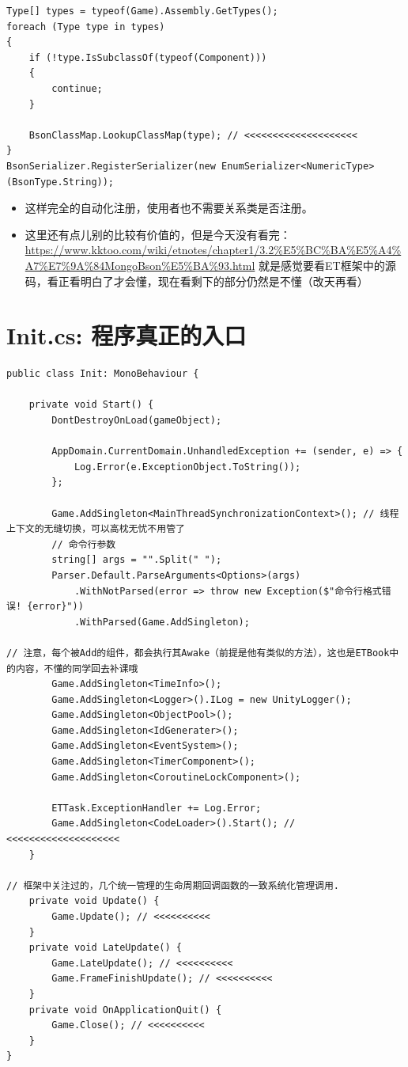 \documentclass[9pt, b5paper]{article}
\begin{document}
\begin{verbatim}
Type[] types = typeof(Game).Assembly.GetTypes();
foreach (Type type in types)
{
    if (!type.IsSubclassOf(typeof(Component)))
    {
        continue;
    }

    BsonClassMap.LookupClassMap(type); // <<<<<<<<<<<<<<<<<<<< 
}
BsonSerializer.RegisterSerializer(new EnumSerializer<NumericType>(BsonType.String));
\end{verbatim}
\begin{itemize}
\item 这样完全的自动化注册，使用者也不需要关系类是否注册。
\item 这里还有点儿别的比较有价值的，但是今天没有看完：\url{https://www.kktoo.com/wiki/etnotes/chapter1/3.2\%E5\%BC\%BA\%E5\%A4\%A7\%E7\%9A\%84MongoBson\%E5\%BA\%93.html}  就是感觉要看ET框架中的源码，看正看明白了才会懂，现在看剩下的部分仍然是不懂（改天再看）
\end{itemize}
\section{Init.cs: 程序真正的入口}
\label{sec-6}
\begin{verbatim}
public class Init: MonoBehaviour {

    private void Start() {
        DontDestroyOnLoad(gameObject);
            
        AppDomain.CurrentDomain.UnhandledException += (sender, e) => {
            Log.Error(e.ExceptionObject.ToString());
        };
                
        Game.AddSingleton<MainThreadSynchronizationContext>(); // 线程上下文的无缝切换，可以高枕无忧不用管了
        // 命令行参数
        string[] args = "".Split(" ");
        Parser.Default.ParseArguments<Options>(args)
            .WithNotParsed(error => throw new Exception($"命令行格式错误! {error}"))
            .WithParsed(Game.AddSingleton);

// 注意，每个被Add的组件，都会执行其Awake（前提是他有类似的方法），这也是ETBook中的内容，不懂的同学回去补课哦
        Game.AddSingleton<TimeInfo>();
        Game.AddSingleton<Logger>().ILog = new UnityLogger();
        Game.AddSingleton<ObjectPool>();
        Game.AddSingleton<IdGenerater>();
        Game.AddSingleton<EventSystem>();
        Game.AddSingleton<TimerComponent>();
        Game.AddSingleton<CoroutineLockComponent>();
            
        ETTask.ExceptionHandler += Log.Error;
        Game.AddSingleton<CodeLoader>().Start(); // <<<<<<<<<<<<<<<<<<<< 
    }
        
// 框架中关注过的，几个统一管理的生命周期回调函数的一致系统化管理调用. 
    private void Update() {
        Game.Update(); // <<<<<<<<<< 
    }
    private void LateUpdate() {
        Game.LateUpdate(); // <<<<<<<<<< 
        Game.FrameFinishUpdate(); // <<<<<<<<<< 
    }
    private void OnApplicationQuit() {
        Game.Close(); // <<<<<<<<<< 
    }
}
\end{verbatim}
\end{document}
